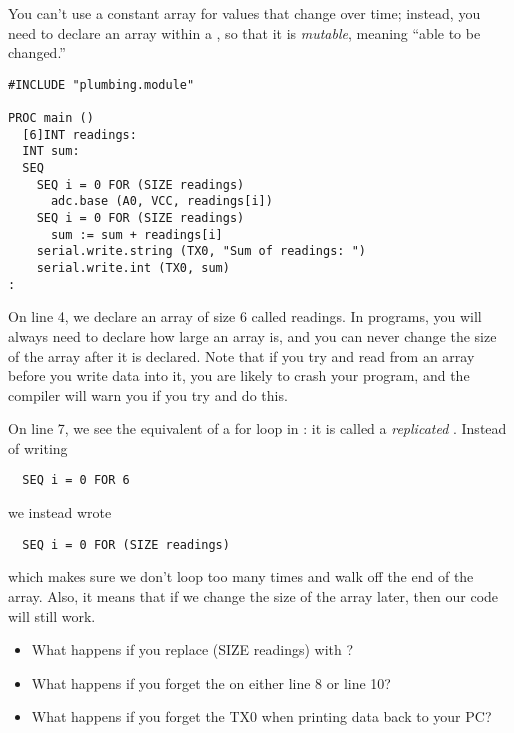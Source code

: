 \solution
You can't use a constant array for values that change over time; instead, you need to declare an array within a \PROC, so that it is \emph{mutable}, meaning ``able to be changed.''

\begin{lstlisting}
#INCLUDE "plumbing.module"

PROC main ()
  [6]INT readings:
  INT sum:
  SEQ
    SEQ i = 0 FOR (SIZE readings)
      adc.base (A0, VCC, readings[i])
    SEQ i = 0 FOR (SIZE readings)
      sum := sum + readings[i]
    serial.write.string (TX0, "Sum of readings: ")
    serial.write.int (TX0, sum)
:
\end{lstlisting}

\discussion
On line 4, we declare an array of size 6 called {\code readings}. In \occam programs, you will always need to declare how large an array is, and you can never change the size of the array after it is declared. Note that if you try and read from an array before you write data into it, you are likely to crash your \occam program, and the compiler will warn you if you try and do this.

On line 7, we see the equivalent of a {\code for} loop in \occam: it is called a \emph{replicated \SEQ}. Instead of writing 

\begin{lstlisting}
  SEQ i = 0 FOR 6
\end{lstlisting}

we instead wrote 

\begin{lstlisting}
  SEQ i = 0 FOR (SIZE readings)
\end{lstlisting}

which makes sure we don't loop too many times and walk off the end of the array. Also, it means that if we change the size of the array later, then our code will still work.

\makingthingsbreak
\begin{itemize}
	\item What happens if you replace {\code (SIZE readings}) with {}?
	\item What happens if you forget the {\code [i]} on either line 8 or line 10?
	\item What happens if you forget the {\code TX0} when printing data back to your PC?
\end{itemize}

\seealso

\XXX


